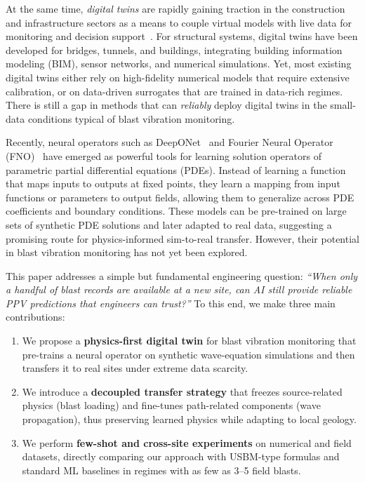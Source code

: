 \documentclass[a4paper,fleqn]{cas-sc}
\begin{document}
At the same time, \emph{digital twins} are rapidly gaining traction in the construction and infrastructure sectors
as a means to couple virtual models with live data for monitoring and decision support~\citep{Boje2020SemanticDT,Cao2021DTIntelligentConstruction,Tita2023BridgeDTBIM}.
For structural systems, digital twins have been developed for bridges, tunnels, and buildings,
integrating building information modeling (BIM), sensor networks, and numerical simulations.
Yet, most existing digital twins either rely on high-fidelity numerical models that require extensive calibration,
or on data-driven surrogates that are trained in data-rich regimes.
There is still a gap in methods that can \emph{reliably} deploy digital twins in the small-data conditions typical of blast vibration monitoring.

Recently, neural operators such as DeepONet~\citep{Lu2021DeepONet} and Fourier Neural Operator (FNO)~\citep{Li2021FNO}
have emerged as powerful tools for learning solution operators of parametric partial differential equations (PDEs).
Instead of learning a function that maps inputs to outputs at fixed points,
they learn a mapping from input functions or parameters to output fields,
allowing them to generalize across PDE coefficients and boundary conditions.
These models can be pre-trained on large sets of synthetic PDE solutions and later adapted to real data,
suggesting a promising route for physics-informed sim-to-real transfer.
However, their potential in blast vibration monitoring has not yet been explored.

This paper addresses a simple but fundamental engineering question:
\emph{``When only a handful of blast records are available at a new site, can AI still provide reliable PPV predictions that engineers can trust?''}
To this end, we make three main contributions:

\begin{enumerate}
  \item We propose a \textbf{physics-first digital twin} for blast vibration monitoring that pre-trains a neural operator
        on synthetic wave-equation simulations and then transfers it to real sites under extreme data scarcity.
  \item We introduce a \textbf{decoupled transfer strategy} that freezes source-related physics (blast loading)
        and fine-tunes path-related components (wave propagation),
        thus preserving learned physics while adapting to local geology.
  \item We perform \textbf{few-shot and cross-site experiments} on numerical and field datasets,
        directly comparing our approach with USBM-type formulas and standard ML baselines
        in regimes with as few as 3--5 field blasts.
\end{enumerate}
\end{document}
